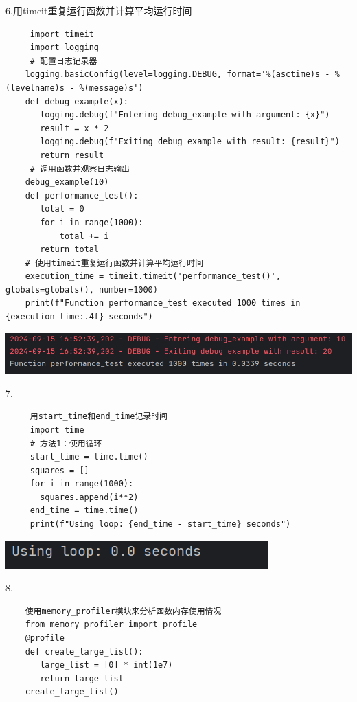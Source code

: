 \documentclass{article}
\begin{document}
6.用timeit重复运行函数并计算平均运行时间
\begin{verbatim}
     import timeit
     import logging
     # 配置日志记录器
    logging.basicConfig(level=logging.DEBUG, format='%(asctime)s - %(levelname)s - %(message)s')
    def debug_example(x):
       logging.debug(f"Entering debug_example with argument: {x}")
       result = x * 2
       logging.debug(f"Exiting debug_example with result: {result}")
       return result
     # 调用函数并观察日志输出
    debug_example(10)
    def performance_test():
       total = 0
       for i in range(1000):
           total += i
       return total
    # 使用timeit重复运行函数并计算平均运行时间
    execution_time = timeit.timeit('performance_test()', globals=globals(), number=1000)
    print(f"Function performance_test executed 1000 times in {execution_time:.4f} seconds")
\end{verbatim}



\noindent
\begin{minipage}{\linewidth}
 \centering
  \includegraphics[width=0.5\linewidth]{学习6.png}
  \label{fig:example}
\end{minipage}


7.
\begin{verbatim}
     用start_time和end_time记录时间
     import time
     # 方法1：使用循环
     start_time = time.time()
     squares = []
     for i in range(1000):
       squares.append(i**2)
     end_time = time.time()
     print(f"Using loop: {end_time - start_time} seconds")       
\end{verbatim}

\noindent
\begin{minipage}{\linewidth}
 \centering
  \includegraphics[width=0.5\linewidth]{学习7.png}
  \label{fig:example}
\end{minipage}

8.
\begin{verbatim}
    使用memory_profiler模块来分析函数内存使用情况
    from memory_profiler import profile
    @profile
    def create_large_list():
       large_list = [0] * int(1e7)
       return large_list
    create_large_list()
\end{verbatim}
\end{document}
